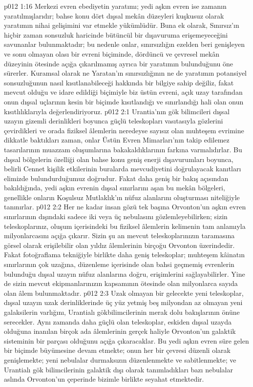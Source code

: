 \vs p012 1:16 Merkezi evren ebediyetin yaratımı; yedi aşkın evren ise zamanın yaratılmışlarıdır; bahse konu dört dışsal mekân düzeyleri kuşkusuz olarak yaratımın nihai gelişimini var etmekle yükümlüdür. Buna ek olarak, Sınırsız’ın hiçbir zaman sonsuzluk haricinde bütüncül bir dışavuruma erişemeyeceğini savunanlar bulunmaktadır; bu nedenle onlar, sınırsızlığın ezelden beri genişleyen ve sonu olmayan olası bir evreni biçiminde, dördüncü ve çevresel mekân düzeyinin ötesinde açığa çıkarılmamış ayrıca bir yaratımın bulunduğunu öne sürerler. Kuramsal olarak ne Yaratan’ın sınırsızlığının ne de yaratımın potansiyel sonsuzluğunun nasıl kısıtlanabileceği hakkında bir bilgiye sahip değiliz, fakat mevcut olduğu ve idare edildiği biçimiyle biz üstün evreni, açık uzay tarafından onun dışsal uçlarının kesin bir biçimde kısıtlandığı ve sınırlandığı hali olan onun kısıtlılıklarıyla değerlendiriyoruz.
\vs p012 2:1 Urantia’nın gök bilimcileri dışsal uzayın gizemli derinlikleri boyunca güçlü teleskopları vasıtasıyla gözlerini çevirdikleri ve orada fiziksel âlemlerin neredeyse sayısız olan muhteşem evrimine dikkatle baktıkları zaman, onlar Üstün Evren Mimarları’nın takip edilemez tasarılarının muazzam oluşumlarına bakakaldıklarının farkına varmalıdırlar. Bu dışsal bölgelerin özelliği olan bahse konu geniş enerji dışavurumları boyunca, belirli Cennet kişilik etkilerinin buralarda mevcudiyetini doğrulayacak kanıtları elimizde bulundurduğumuz doğrudur. Fakat daha geniş bir bakış açısından bakıldığında, yedi aşkın evrenin dışsal sınırlarını aşan bu mekân bölgeleri, genellikle onların Koşulsuz Mutlaklık’ın nüfuz alanlarını oluşturması niteliğiyle tanınırlar.
\vs p012 2:2 Her ne kadar insan gözü tek başına Orvonton’un aşkın evren sınırlarının dışındaki sadece iki veya üç nebulasını gözlemleyebilirken; sizin teleskoplarınız, oluşum içerisindeki bu fiziksel âlemlerin kelimenin tam anlamıyla milyonlarcasını açığa çıkarır. Sizin şu an mevcut teleskoplarınızın taramasına görsel olarak erişilebilir olan yıldız âlemlerinin birçoğu Orvonton üzerindedir. Fakat fotoğraflama tekniğiyle birlikte daha geniş teleskoplar; muhteşem kâinatın sınırlarının çok uzağına, düzenleme içerisinde olan bahsi geçmemiş evrenlerin bulunduğu dışsal uzayın nüfuz alanlarına doğru, erişimlerini sağlayabilirler. Yine de sizin mevcut ekipmanlarınızın kapsamının ötesinde olan milyonlarca sayıda olan âlem bulunmaktadır.
\vs p012 2:3 Uzak olmayan bir gelecekte yeni teleskoplar, dışsal uzayın uzak derinliklerinde üç yüz yetmiş beş milyondan az olmayan yeni galaksilerin varlığını, Urantialı gökbilimcilerinin merak dolu bakışlarının önüne serecekler. Aynı zamanda daha güçlü olan teleskoplar, eskiden dışsal uzayda olduğuna inanılan birçok ada âlemlerinin gerçek haliyle Orvonton’un galaktik sisteminin bir parçası olduğunu açığa çıkaracaklar. Bu yedi aşkın evren süre gelen bir biçimde büyümesine devam etmekte; onun her bir çevresi düzenli olarak genişlemekte; yeni nebulalar durmaksızın düzenlenmekte ve sabitlenmekte; ve Urantialı gök bilimcilerinin galaktik dışı olarak tanımladıkları bazı nebulalar aslında Orvonton’un çeperinde bizimle birlikte seyahat etmektedir.
